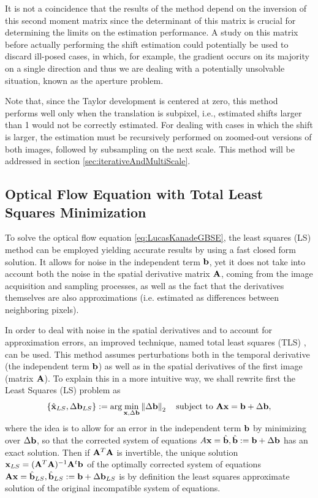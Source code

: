 It is not a coincidence that the results of the method depend on the inversion of this second moment matrix since the determinant of this matrix is crucial for determining the limits on the estimation performance. A study on this matrix before actually performing the shift estimation could potentially be used to discard ill-posed cases, in which, for example, the gradient occurs on its majority on a single direction and thus we are dealing with a potentially unsolvable situation, known as the aperture problem. 

Note that, since the Taylor development is centered at zero, this method performs well only when the translation is subpixel, i.e., estimated shifts larger than 1 would not be correctly estimated. For dealing with cases in which the shift is larger, the estimation must be recursively performed on zoomed-out versions of both images, followed by subsampling on the next scale. This method will be addressed in section \ref{sec:iterativeAndMultiScale}.

\subsection{Optical Flow Equation with Total Least Squares Minimization}
\label{sec:tlsminimization}
To solve the optical flow equation \eqref{eq:LucasKanadeGBSE}, the least squares (LS) method can be employed yielding accurate results by using a fast closed form solution. It allows for noise in the independent term $\mathbf{b}$, yet it does not take into account both the noise in the spatial derivative matrix $\mathbf{A}$, coming from the image acquisition and sampling processes, as well as the fact that the derivatives themselves are also approximations (i.e. estimated as differences between neighboring pixels). 

In order to deal with noise in the spatial derivatives and to account for approximation errors, an improved technique, named total least squares (TLS) \cite{VanHuffel1987313, markovsky2007overview}, can be used. This method assumes perturbations both in the temporal derivative (the independent term $\mathbf{b}$) as well as in the spatial derivatives of the first image (matrix $\mathbf{A}$). To explain this in a more intuitive way, we shall rewrite first the Least Squares (LS) problem as
\begin{equation}
\{\hat {\mathbf{x}}_{LS}, \Delta \mathbf{b}_{LS}\} := \arg \min_{\mathbf{x},\Delta \mathbf{b}} \left\lVert\Delta \mathbf{b}\right\rVert_2 \ \ \text{ subject to } \mathbf{A}\mathbf{x} = \mathbf{b} + \Delta \mathbf{b},
\end{equation}
where the idea is to allow for an error in the independent term $\mathbf{b}$ by minimizing over $\Delta \mathbf{b}$, so that the corrected system of equations $A\mathbf{x} = \hat {\mathbf{b}}, \hat {\mathbf{b}} := \mathbf{b} + \Delta \mathbf{b}$ has an exact solution. Then if $\mathbf{A}^T \mathbf{A}$ is invertible, the unique solution $\mathbf{x}_{LS} = (\mathbf{A}^T\mathbf{A})^{-1} \mathbf{A}^t \mathbf{b}$ of the optimally corrected system of equations $\mathbf{A}\mathbf{x} = \hat {\mathbf{b}}_{LS}, \hat {\mathbf{b}}_{LS} := \mathbf{b} + \Delta \mathbf{b}_{LS}$ is by definition the least squares approximate solution of the original incompatible system of equations.

